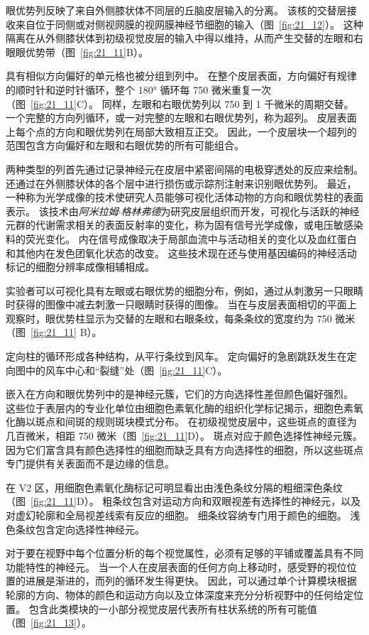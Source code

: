 眼优势列反映了来自外侧膝状体不同层的丘脑皮层输入的分离。
该核的交替层接收来自位于同侧或对侧视网膜的视网膜神经节细胞的输入（图~\ref{fig:21_12}）。
这种隔离在从外侧膝状体到初级视觉皮层的输入中得以维持，从而产生交替的左眼和右眼眼优势带（图~\ref{fig:21_11}B）。


具有相似方向偏好的单元格也被分组到列中。
在整个皮层表面，方向偏好有规律的顺时针和逆时针循环，整个 180° 循环每 750 微米重复一次（图~\ref{fig:21_11}C）。
同样，左眼和右眼优势列以 750 到 1 千微米的周期交替。
一个完整的方向列循环，或一对完整的左眼和右眼优势列，称为超列。
皮层表面上每个点的方向和眼优势列在局部大致相互正交。
因此，一个皮层块一个超列的范围包含方向偏好和左眼和右眼优势的所有可能组合。


两种类型的列首先通过记录神经元在皮层中紧密间隔的电极穿透处的反应来绘制。
还通过在外侧膝状体的各个层中进行损伤或示踪剂注射来识别眼优势列。
最近，一种称为光学成像的技术使研究人员能够可视化活体动物的方向和眼优势柱的表面表示。 
该技术由\textit{阿米拉姆$\cdot$格林弗德}为研究皮层组织而开发，可视化与活跃的神经元群的代谢需求相关的表面反射率的变化，称为固有信号光学成像，或电压敏感染料的荧光变化。 
内在信号成像取决于局部血流中与活动相关的变化以及血红蛋白和其他内在发色团氧化状态的改变。 
这些技术现在还与使用基因编码的神经活动标记的细胞分辨率成像相辅相成。


实验者可以可视化具有左眼或右眼优势的细胞分布，例如，通过从刺激另一只眼睛时获得的图像中减去刺激一只眼睛时获得的图像。 
当在与皮层表面相切的平面上观察时，眼优势柱显示为交替的左眼和右眼条纹，每条条纹的宽度约为 750 微米（图~\ref{fig:21_11} B）。


定向柱的循环形成各种结构，从平行条纹到风车。 
定向偏好的急剧跳跃发生在定向图中的风车中心和“裂缝”处（图~\ref{fig:21_11}C）。


嵌入在方向和眼优势列中的是神经元簇，它们的方向选择性差但颜色偏好强烈。
这些位于表层内的专业化单位由细胞色素氧化酶的组织化学标记揭示，细胞色素氧化酶以斑点和间斑的规则斑块模式分布。
在初级视觉皮层中，这些斑点的直径为几百微米，相距 750 微米（图~\ref{fig:21_11}D）。
斑点对应于颜色选择性神经元簇。
因为它们富含具有颜色选择性的细胞而缺乏具有方向选择性的细胞，所以这些斑点专门提供有关表面而不是边缘的信息。


在 V2 区，用细胞色素氧化酶标记可明显看出由浅色条纹分隔的粗细深色条纹（图~\ref{fig:21_11}D）。
粗条纹包含对运动方向和双眼视差有选择性的神经元，以及对虚幻轮廓和全局视差线索有反应的细胞。
细条纹容纳专门用于颜色的细胞。
浅色条纹包含定向选择性神经元。


对于要在视野中每个位置分析的每个视觉属性，必须有足够的平铺或覆盖具有不同功能特性的神经元。
当一个人在皮层表面的任何方向上移动时，感受野的视位位置的进展是渐进的，而列的循环发生得更快。
因此，可以通过单个计算模块根据轮廓的方向、物体的颜色和运动方向以及立体深度来充分分析视野中的任何给定位置。
包含此类模块的一小部分视觉皮层代表所有柱状系统的所有可能值（图~\ref{fig:21_13}）。


